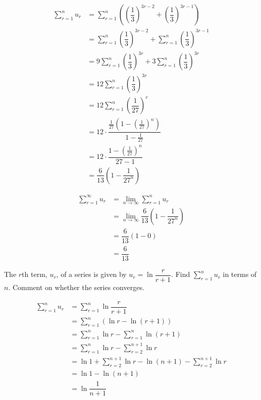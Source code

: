 \documentclass{echw}
\begin{document}
    \solution
        \begin{align*}
            \sum\limits_{r=1}^n u_r &= \sum\limits_{r=1}^n \left(\left(\dfrac13\right)^{3r-2} + \left(\dfrac13\right)^{3r-1}\right)\\
            &= \sum\limits_{r=1}^n \left(\dfrac13\right)^{3r-2} + \sum\limits_{r=1}^n \left(\dfrac13\right)^{3r-1}\\
            &= 9\sum\limits_{r=1}^n \left(\dfrac13\right)^{3r} + 3\sum\limits_{r=1}^n \left(\dfrac13\right)^{3r}\\
            &= 12\sum\limits_{r=1}^n \left(\dfrac13\right)^{3r}\\
            &= 12\sum\limits_{r=1}^n \left(\dfrac1{27}\right)^{r}\\
            &= 12 \cdot \dfrac{\tfrac1{27}(1-(\tfrac1{27})^n)}{1-\tfrac1{27}}\\
            &= 12 \cdot \dfrac{1-(\tfrac1{27})^n}{27 - 1}\\
            &= \dfrac{6}{13} \left(1-\dfrac1{27^n}\right)
        \end{align*}


        \begin{align*}
            \sum\limits_{r=1}^\infty u_r &= \lim_{n \rightarrow \infty} \sum\limits_{r=1}^n u_r\\
            &= \lim_{n \rightarrow \infty} \dfrac{6}{13} \left(1-\dfrac1{27^n}\right)\\
            &= \dfrac{6}{13} (1-0)\\
            &= \dfrac6{13}
        \end{align*}


    \problem{}
        The $r$th term, $u_r$, of a series is given by $u_r = \ln \dfrac{r}{r+1}$. Find $\sum\limits_{r=1}^n u_r$ in terms of $n$. Comment on whether the series converges.

    \solution
        \begin{align*}
            \sum\limits_{r=1}^n u_r &= \sum\limits_{r=1}^n \ln \dfrac{r}{r+1}\\
            &= \sum\limits_{r=1}^n (\ln r - \ln (r+1))\\
            &= \sum\limits_{r=1}^n \ln r - \sum\limits_{r=1}^n\ln (r+1)\\
            &= \sum\limits_{r=1}^n \ln r - \sum\limits_{r=2}^{n+1}\ln r\\
            &= \ln 1 + \sum\limits_{r=2}^{n+1} \ln r - \ln (n+1) - \sum\limits_{r=2}^{n+1}\ln r\\
            &= \ln 1 - \ln (n+1)\\
            &= \ln \dfrac1{n+1}
        \end{align*}
\end{document}
